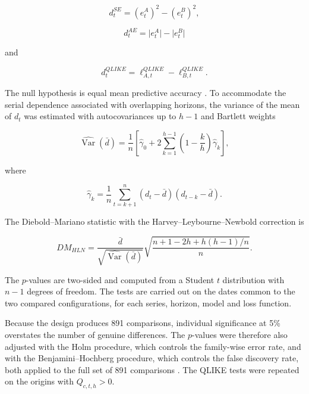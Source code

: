 \documentclass[a4paper,fleqn]{cas-sc}
\begin{document}
\begin{equation}
d_t^{SE}=(e^{A}_{t})^{2}-(e^{B}_{t})^{2},
\label{eq:dm_se}
\end{equation}

\begin{equation}
d_t^{AE}=\lvert e^{A}_{t}\rvert-\lvert e^{B}_{t}\rvert
\label{eq:dm_ae}
\end{equation}

and

\begin{equation}
d_t^{QLIKE}
=
\ell^{QLIKE}_{A,t}-\ell^{QLIKE}_{B,t}.
\label{eq:dm_qlike}
\end{equation}

The null hypothesis is equal mean predictive accuracy \citep{DieboldMariano1995,HarveyLeybourneNewbold1997}. To accommodate the serial dependence associated with overlapping horizons, the variance of the mean of \(d_t\) was estimated with autocovariances up to \(h-1\) and Bartlett weights

\begin{equation}
\widehat{\operatorname{Var}}(\bar d)
=
\frac{1}{n}
\left[
\widehat{\gamma}_{0}
+2\sum_{k=1}^{h-1}
\left(1-\frac{k}{h}\right)\widehat{\gamma}_{k}
\right],
\label{eq:dm_variance}
\end{equation}

where

\begin{equation}
\widehat{\gamma}_{k}
=
\frac{1}{n}
\sum_{t=k+1}^{n}
(d_t-\bar d)(d_{t-k}-\bar d).
\label{eq:dm_covariance}
\end{equation}

The Diebold--Mariano statistic with the Harvey--Leybourne--Newbold correction is

\begin{equation}
DM_{HLN}
=
\frac{\bar d}{\sqrt{\widehat{\operatorname{Var}}(\bar d)}}
\sqrt{
\frac{n+1-2h+h(h-1)/n}{n}
}.
\label{eq:dm_hln}
\end{equation}

The \(p\)-values are two-sided and computed from a Student \(t\) distribution with \(n-1\) degrees of freedom. The tests are carried out on the dates common to the two compared configurations, for each series, horizon, model and loss function.

Because the design produces 891 comparisons, individual significance at 5\% overstates the number of genuine differences. The \(p\)-values were therefore also adjusted with the Holm procedure, which controls the family-wise error rate, and with the Benjamini--Hochberg procedure, which controls the false discovery rate, both applied to the full set of 891 comparisons \citep{Holm1979,BenjaminiHochberg1995}. The QLIKE tests were repeated on the origins with \(Q_{c,t,h}>0\).
\end{document}
